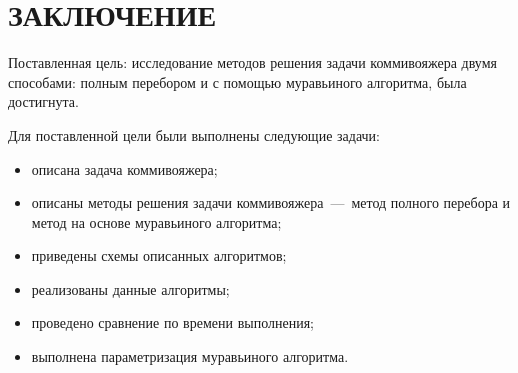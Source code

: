 \chapter*{\hfill{\centering  ЗАКЛЮЧЕНИЕ}\hfill}

Поставленная цель: исследование методов решения задачи коммивояжера двумя способами: полным перебором и с помощью муравьиного алгоритма, была достигнута.

Для поставленной цели были выполнены следующие задачи:
\begin{itemize}
	\item описана задача коммивояжера;
	\item описаны методы решения задачи коммивояжера~---~метод полного перебора и метод на основе муравьиного алгоритма;
	\item приведены схемы описанных алгоритмов;
	\item реализованы данные алгоритмы;
	\item проведено сравнение по времени выполнения;
	\item выполнена параметризация муравьиного алгоритма.
\end{itemize}